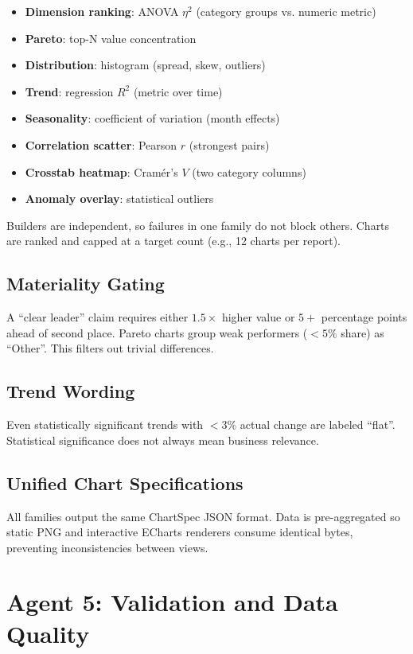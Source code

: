 \begin{itemize}
	\item \textbf{Dimension ranking}: ANOVA $\eta^2$ (category groups vs. numeric metric)
	\item \textbf{Pareto}: top-N value concentration
	\item \textbf{Distribution}: histogram (spread, skew, outliers)
	\item \textbf{Trend}: regression $R^2$ (metric over time)
	\item \textbf{Seasonality}: coefficient of variation (month effects)
	\item \textbf{Correlation scatter}: Pearson $r$ (strongest pairs)
	\item \textbf{Crosstab heatmap}: Cramér's $V$ (two category columns)
	\item \textbf{Anomaly overlay}: statistical outliers
\end{itemize}

Builders are independent, so failures in one family do not block others. Charts are ranked and capped at a target count (e.g., 12 charts per report).

\subsection{Materiality Gating}

A ``clear leader'' claim requires either $1.5\times$ higher value or $5+$ percentage points ahead of second place. Pareto charts group weak performers ($<5\%$ share) as ``Other''. This filters out trivial differences.

\subsection{Trend Wording}

Even statistically significant trends with $<3\%$ actual change are labeled ``flat''. Statistical significance does not always mean business relevance.

\subsection{Unified Chart Specifications}

All families output the same ChartSpec JSON format. Data is pre-aggregated so static PNG and interactive ECharts renderers consume identical bytes, preventing inconsistencies between views.

\section{Agent 5: Validation and Data Quality}

